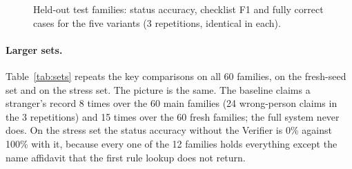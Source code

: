 \begin{figure}[t]
\centering
{}
\caption[Status accuracy, F1 and fully correct cases (test families)]{Held-out test families: status accuracy, checklist F1 and fully correct cases for the five variants (3 repetitions, identical in each).}
\label{fig:bars}
\end{figure}

\paragraph{Larger sets.} Table~\ref{tab:sets} repeats the key comparisons on all 60 families, on the fresh-seed set and on the stress set. The picture is the same. The baseline claims a stranger's record 8 times over the 60 main families (24 wrong-person claims in the 3 repetitions) and 15 times over the 60 fresh families; the full system never does. On the stress set the status accuracy without the Verifier is 0\% against 100\% with it, because every one of the 12 families holds everything except the name affidavit that the first rule lookup does not return.

